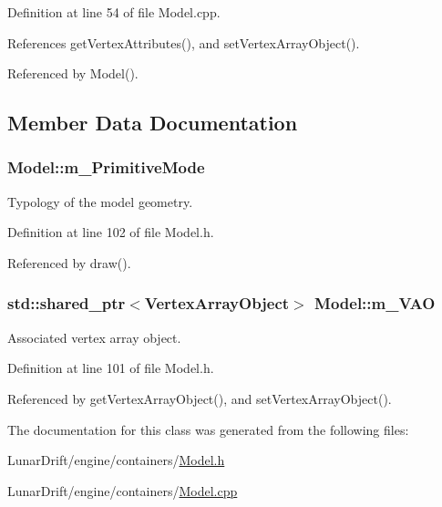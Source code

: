 Definition at line 54 of file Model.\+cpp.



References get\+Vertex\+Attributes(), and set\+Vertex\+Array\+Object().



Referenced by Model().



\subsection{Member Data Documentation}
\subsubsection[{\texorpdfstring{m\+\_\+\+Primitive\+Mode}{m_PrimitiveMode}}]{ Model\+::m\+\_\+\+Primitive\+Mode\hspace{0.3cm}{\ttfamily [private]}}\hypertarget{class_model_af07134f1b940eb354fa85c3524d70411}{}\label{class_model_af07134f1b940eb354fa85c3524d70411}


Typology of the model geometry. 



Definition at line 102 of file Model.\+h.



Referenced by draw().

\subsubsection[{\texorpdfstring{m\+\_\+\+V\+AO}{m_VAO}}]{\setlength{\rightskip}{0pt plus 5cm}std\+::shared\+\_\+ptr$<${\bf Vertex\+Array\+Object}$>$ Model\+::m\+\_\+\+V\+AO\hspace{0.3cm}{\ttfamily [private]}}\hypertarget{class_model_a33ddd71b6e11029a482f8fd0786d064d}{}\label{class_model_a33ddd71b6e11029a482f8fd0786d064d}


Associated vertex array object. 



Definition at line 101 of file Model.\+h.



Referenced by get\+Vertex\+Array\+Object(), and set\+Vertex\+Array\+Object().



The documentation for this class was generated from the following files\+:\begin{DoxyCompactItemize}
\item 
Lunar\+Drift/engine/containers/\hyperlink{_model_8h}{Model.\+h}\item 
Lunar\+Drift/engine/containers/\hyperlink{_model_8cpp}{Model.\+cpp}\end{DoxyCompactItemize}
